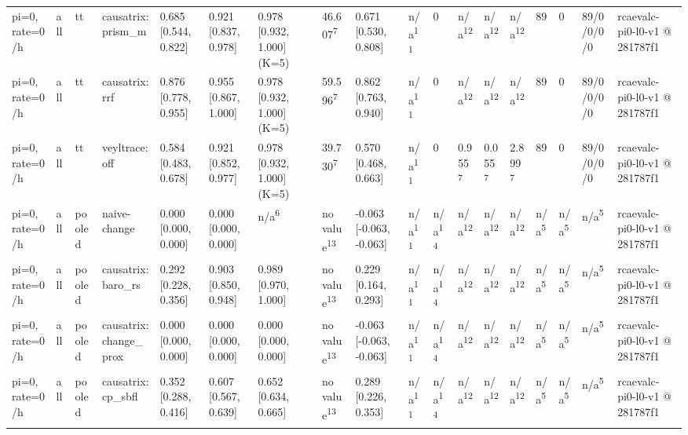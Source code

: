 \begin{table}[t]
\begin{tabular}{llllllllllllllllll}
pi=0, rate=0/h & all & tt & causatrix:prism\_m & 0.685 [0.544, 0.822] & 0.921 [0.837, 0.978] & 0.978 [0.932, 1.000] (K=5) & 46.607\textsuperscript{7} & 0.671 [0.530, 0.808] & n/a\textsuperscript{11} & 0 & n/a\textsuperscript{12} & n/a\textsuperscript{12} & n/a\textsuperscript{12} & 89 & 0 & 89/0/0/0/0 & rcaevalc-pi0-l0-v1 @ 281787f1 \\
pi=0, rate=0/h & all & tt & causatrix:rrf & 0.876 [0.778, 0.955] & 0.955 [0.867, 1.000] & 0.978 [0.932, 1.000] (K=5) & 59.596\textsuperscript{7} & 0.862 [0.763, 0.940] & n/a\textsuperscript{11} & 0 & n/a\textsuperscript{12} & n/a\textsuperscript{12} & n/a\textsuperscript{12} & 89 & 0 & 89/0/0/0/0 & rcaevalc-pi0-l0-v1 @ 281787f1 \\
pi=0, rate=0/h & all & tt & veyltrace:off & 0.584 [0.483, 0.678] & 0.921 [0.852, 0.977] & 0.978 [0.932, 1.000] (K=5) & 39.730\textsuperscript{7} & 0.570 [0.468, 0.663] & n/a\textsuperscript{11} & 0 & 0.955\textsuperscript{7} & 0.055\textsuperscript{7} & 2.899\textsuperscript{7} & 89 & 0 & 89/0/0/0/0 & rcaevalc-pi0-l0-v1 @ 281787f1 \\
pi=0, rate=0/h & all & pooled & naive-change & 0.000 [0.000, 0.000] & 0.000 [0.000, 0.000] & n/a\textsuperscript{6} & no value\textsuperscript{13} & -0.063 [-0.063, -0.063] & n/a\textsuperscript{11} & n/a\textsuperscript{14} & n/a\textsuperscript{12} & n/a\textsuperscript{12} & n/a\textsuperscript{12} & n/a\textsuperscript{5} & n/a\textsuperscript{5} & n/a\textsuperscript{5} & rcaevalc-pi0-l0-v1 @ 281787f1 \\
pi=0, rate=0/h & all & pooled & causatrix:baro\_rs & 0.292 [0.228, 0.356] & 0.903 [0.850, 0.948] & 0.989 [0.970, 1.000] & no value\textsuperscript{13} & 0.229 [0.164, 0.293] & n/a\textsuperscript{11} & n/a\textsuperscript{14} & n/a\textsuperscript{12} & n/a\textsuperscript{12} & n/a\textsuperscript{12} & n/a\textsuperscript{5} & n/a\textsuperscript{5} & n/a\textsuperscript{5} & rcaevalc-pi0-l0-v1 @ 281787f1 \\
pi=0, rate=0/h & all & pooled & causatrix:change\_prox & 0.000 [0.000, 0.000] & 0.000 [0.000, 0.000] & 0.000 [0.000, 0.000] & no value\textsuperscript{13} & -0.063 [-0.063, -0.063] & n/a\textsuperscript{11} & n/a\textsuperscript{14} & n/a\textsuperscript{12} & n/a\textsuperscript{12} & n/a\textsuperscript{12} & n/a\textsuperscript{5} & n/a\textsuperscript{5} & n/a\textsuperscript{5} & rcaevalc-pi0-l0-v1 @ 281787f1 \\
pi=0, rate=0/h & all & pooled & causatrix:cp\_sbfl & 0.352 [0.288, 0.416] & 0.607 [0.567, 0.639] & 0.652 [0.634, 0.665] & no value\textsuperscript{13} & 0.289 [0.226, 0.353] & n/a\textsuperscript{11} & n/a\textsuperscript{14} & n/a\textsuperscript{12} & n/a\textsuperscript{12} & n/a\textsuperscript{12} & n/a\textsuperscript{5} & n/a\textsuperscript{5} & n/a\textsuperscript{5} & rcaevalc-pi0-l0-v1 @ 281787f1 \\

\end{tabular}
\end{table}
